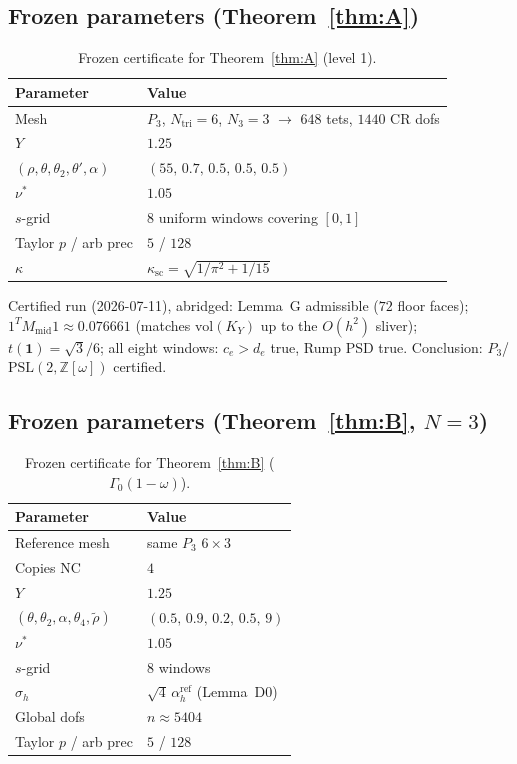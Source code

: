\documentclass[11pt]{amsart}
\newcommand{\ZZ}{\mathbb{Z}}
\newcommand{\PSL}{\mathrm{PSL}}
\newcommand{\vol}{\mathrm{vol}}
\begin{document}
\subsection{Frozen parameters (Theorem~\ref{thm:A})}

\begin{table}[ht]
\centering
\begin{tabular}{@{}ll@{}}
\toprule
Parameter & Value \\
\midrule
Mesh & $P_3$, $N_{\mathrm{tri}}=6$, $N_3=3$
  $\to$ $648$ tets, $1440$ CR dofs \\
$Y$ & $1.25$ \\
$(\rho,\theta,\theta_2,\theta',\alpha)$ & $(55,\,0.7,\,0.5,\,0.5,\,0.5)$ \\
$\nu^*$ & $1.05$ \\
$s$-grid & $8$ uniform windows covering $[0,1]$ \\
Taylor $p$ / arb prec & $5$ / $128$ \\
$\kappa$ & $\kappa_{\mathrm{sc}}=\sqrt{1/\pi^2+1/15}$ \\
\bottomrule
\end{tabular}
\caption{Frozen certificate for Theorem~\ref{thm:A} (level 1).}
\label{tab:A}
\end{table}

Certified run (2026-07-11), abridged: Lemma~G admissible
($72$ floor faces); $1^TM_{\mathrm{mid}}1\approx 0.076661$
(matches $\vol(K_Y)$ up to the $O(h^2)$ sliver);
$t(\mathbf{1})=\sqrt{3}/6$; all eight windows: $c_e>d_e$ true, Rump PSD
true.  Conclusion: $P_3$/$\PSL(2,\ZZ[\omega])$ certified.

\subsection{Frozen parameters (Theorem~\ref{thm:B}, $N=3$)}

\begin{table}[ht]
\centering
\begin{tabular}{@{}ll@{}}
\toprule
Parameter & Value \\
\midrule
Reference mesh & same $P_3$ $6\times 3$ \\
Copies $\mathrm{NC}$ & $4$ \\
$Y$ & $1.25$ \\
$(\theta,\theta_2,\alpha,\theta_4,\tilde\rho)$
  & $(0.5,\,0.9,\,0.2,\,0.5,\,9)$ \\
$\nu^*$ & $1.05$ \\
$s$-grid & $8$ windows \\
$\sigma_h$ & $\sqrt{4}\,\alpha_h^{\mathrm{ref}}$ (Lemma~D0) \\
Global dofs & $n\approx 5404$ \\
Taylor $p$ / arb prec & $5$ / $128$ \\
\bottomrule
\end{tabular}
\caption{Frozen certificate for Theorem~\ref{thm:B}
($\Gamma_0(1-\omega)$).}
\label{tab:B}
\end{table}
\end{document}

